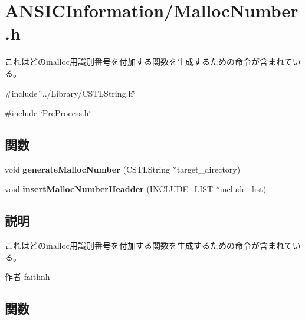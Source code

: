 \section{ANSICInformation/MallocNumber.h}
\label{MallocNumber_8h}


これはどのmalloc用識別番号を付加する関数を生成するための命令が含まれている。  


{\ttfamily \#include \char`\"{}../Library/CSTLString.h\char`\"{}}\par
{\ttfamily \#include \char`\"{}PreProcess.h\char`\"{}}\par
\subsection*{関数}
\begin{DoxyCompactItemize}
\item 
void {\bf generateMallocNumber} (CSTLString $\ast$target\_\-directory)
\item 
void {\bf insertMallocNumberHeadder} (INCLUDE\_\-LIST $\ast$include\_\-list)
\end{DoxyCompactItemize}


\subsection{説明}
これはどのmalloc用識別番号を付加する関数を生成するための命令が含まれている。 \begin{DoxyAuthor}{作者}
faithnh 
\end{DoxyAuthor}


\subsection{関数}

